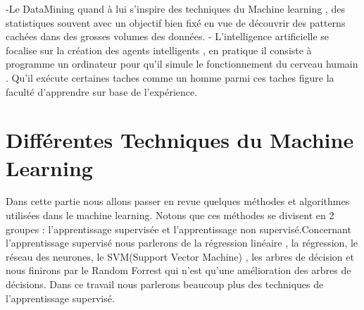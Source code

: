 -Le DataMining quand à lui s'inspire des techniques du Machine learning , des statistiques souvent avec un objectif bien fixé en vue de découvrir des patterns cachées dans des grosses volumes des données.
- L'intelligence artificielle se focalise sur la création des agents intelligents , en pratique il consiste à programme un ordinateur pour qu'il simule le fonctionnement du cerveau humain . Qu'il exécute certaines taches comme un homme parmi ces taches figure la faculté d'apprendre sur base de l'expérience.
\section{{ Différentes Techniques du Machine Learning   \cite{AndNgCourse}	} } 
Dans cette partie nous allons passer en revue quelques méthodes et algorithmes utilisées dans le machine learning.
Notons que ces méthodes se divisent en 2 groupes : l'apprentissage supervisée et l'apprentissage non supervisé.Concernant l'apprentissage supervisé nous parlerons de la régression linéaire , la régression, le réseau des neurones, le SVM(Support Vector Machine) , les arbres de décision et nous finirons par le Random Forrest qui n'est qu'une amélioration des arbres de décisions.
Dans ce travail nous parlerons beaucoup plus des techniques de l'apprentissage supervisé.